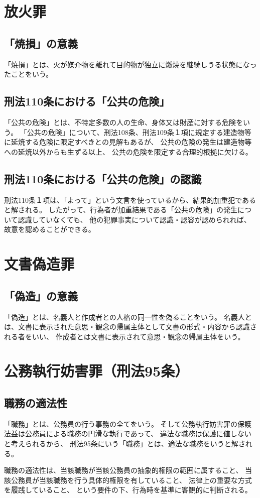 \documentclass[11pt]{jsarticle}
\begin{document}
			
	
	\section{放火罪}
		\subsection{「焼損」の意義}
			「焼損」とは、火が媒介物を離れて目的物が独立に燃焼を継続しうる状態になったことをいう。
			
		\subsection{刑法110条における「公共の危険」}
			「公共の危険」とは、不特定多数の人の生命、身体又は財産に対する危険をいう。
			「公共の危険」について、刑法108条、刑法109条１項に規定する建造物等に延焼する危険に限定すべきとの見解もあるが、
			公共の危険の発生は建造物等への延焼以外からも生ずる以上、
			公共の危険を限定する合理的根拠に欠ける。
			
		\subsection{刑法110条における「公共の危険」の認識}
			刑法110条１項は、「よって」という文言を使っているから、結果的加重犯であると解される。
			したがって、行為者が加重結果である「公共の危険」の発生について認識していなくても、
			他の犯罪事実について認識・認容が認められれば、故意を認めることができる。
		
		
	\section{文書偽造罪}
		\subsection{「偽造」の意義}
			「偽造」とは、名義人と作成者との人格の同一性を偽ることをいう。
			名義人とは、文書に表示された意思・観念の帰属主体として文書の形式・内容から認識される者をいい、
			作成者とは文書に表示されて意思・観念の帰属主体をいう。
			
	
			
	\section{公務執行妨害罪（刑法95条）}
		\subsection{職務の適法性}
			「職務」とは、公務員の行う事務の全てをいう。
			そして公務執行妨害罪の保護法益は公務員による職務の円滑な執行であって、
			違法な職務は保護に値しないと考えられるから、
			刑法95条にいう「職務」とは、適法な職務をいうと解される。
			
			職務の適法性は、当該職務が当該公務員の抽象的権限の範囲に属すること、
			当該公務員が当該職務を行う具体的権限を有していること、
			法律上の重要な方式を履践していること、
			という要件の下、行為時を基準に客観的に判断される。
		

	
		
		
		
	






	
\end{document}
